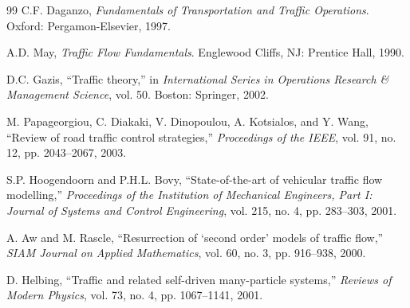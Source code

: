 \documentclass[11pt,a4paper]{article}
\begin{document}
\begin{thebibliography}{99}
C.F. Daganzo, \textit{Fundamentals of Transportation and Traffic Operations}. Oxford: Pergamon-Elsevier, 1997.

A.D. May, \textit{Traffic Flow Fundamentals}. Englewood Cliffs, NJ: Prentice Hall, 1990.

D.C. Gazis, ``Traffic theory,'' in \textit{International Series in Operations Research \& Management Science}, vol. 50. Boston: Springer, 2002.

M. Papageorgiou, C. Diakaki, V. Dinopoulou, A. Kotsialos, and Y. Wang, ``Review of road traffic control strategies,'' \textit{Proceedings of the IEEE}, vol. 91, no. 12, pp. 2043--2067, 2003.

S.P. Hoogendoorn and P.H.L. Bovy, ``State-of-the-art of vehicular traffic flow modelling,'' \textit{Proceedings of the Institution of Mechanical Engineers, Part I: Journal of Systems and Control Engineering}, vol. 215, no. 4, pp. 283--303, 2001.

A. Aw and M. Rascle, ``Resurrection of `second order' models of traffic flow,'' \textit{SIAM Journal on Applied Mathematics}, vol. 60, no. 3, pp. 916--938, 2000.

D. Helbing, ``Traffic and related self-driven many-particle systems,'' \textit{Reviews of Modern Physics}, vol. 73, no. 4, pp. 1067--1141, 2001.

\end{thebibliography}
\end{document}
